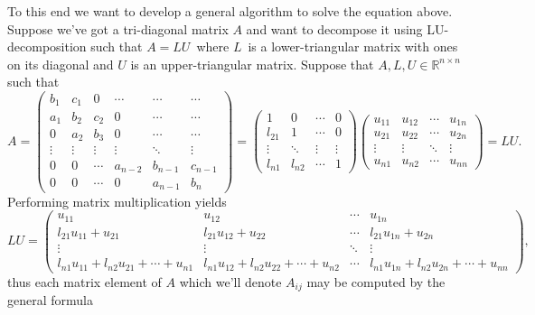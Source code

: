 \documentclass[english,notitlepage]{revtex4-1}  %
\begin{document}
To this end we want to develop a general algorithm to solve the equation above. Suppose we've got a tri-diagonal matrix $A$ and want to decompose it using LU-decomposition such that $A = LU$ where $L$ is a lower-triangular matrix with ones on its diagonal and $U$ is an upper-triangular matrix. Suppose that $A,L,U \in \mathbb{R}^{n\times n}$ such that 
\begin{equation} A= 
	\begin{pmatrix}
	b_1 & c_1 & 0 & \cdots & \cdots & \cdots \\
	a_1 & b_2 & c_2 & 0  &\cdots & \cdots  \\ 
	0 & a_2 & b_3 & 0 & \cdots & \cdots \\
	\vdots & \vdots & \vdots & \vdots & \ddots & \vdots \\
	0 & 0 & \cdots & a_{n-2} & b_{n-1} & c_{n-1} \\
	0 & 0 & \cdots  & 0 & a_{n-1} & b_n
	\end{pmatrix}
	= 
	\begin{pmatrix}
	1 & 0 & \cdots & 0\\
	l_{21} & 1 &  \cdots & 0 \\ 
	\vdots  & \ddots & \vdots & \vdots  \\
	l_{n1} & l_{n2} & \cdots & 1  
	\end{pmatrix}
	\begin{pmatrix}
	u_{11} & u_{12} & \cdots & u_{1n} \\ 
	u_{21} & u_{22} & \cdots & u_{2n} \\
	\vdots & \vdots & \ddots & \vdots \\
	u_{n1} & u_{n2} & \cdots & u_{nn}
	\end{pmatrix}
	= LU.
\end{equation}
Performing matrix multiplication yields 
\begin{equation}\label{LU_decomp}
	LU = \begin{pmatrix}
	u_{11} & u_{12} & \cdots & u_{1n} \\
	l_{21}u_{11} + u_{21} & l_{21}u_{12} + u_{22} & \cdots & l_{21}u_{1n} + u_{2n} \\
	\vdots & \vdots & \ddots & \vdots \\
	l_{n1}u_{11} + l_{n2}u_{21} + \cdots + u_{n1} & l_{n1}u_{12} + l_{n2}u_{22} + \cdots + u_{n2} & \cdots & l_{n1}u_{1n} + l_{n2}u_{2n} + \cdots + u_{nn}
	\end{pmatrix},
\end{equation}
thus each matrix element of $A$ which we'll denote $A_{ij}$ may be computed by the general formula 
\end{document}
